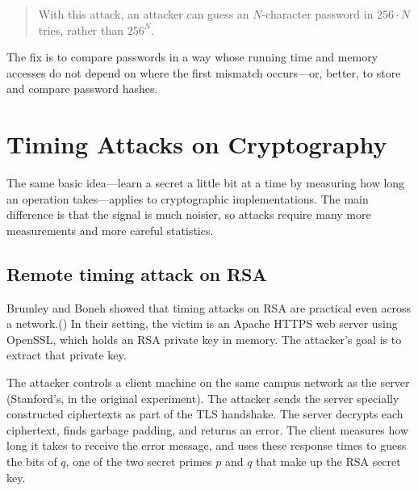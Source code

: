 \documentclass[
  letterpaper,
]{scrbook}
\theoremstyle{definition}
\theoremstyle{plain}
\theoremstyle{plain}
\theoremstyle{remark}
\begin{document}
\begin{quote}
With this attack, an attacker can guess an \(N\)-character password in
\(256 \cdot N\) tries, rather than \(256^N\).
\end{quote}

{}

The fix is to compare passwords in a way whose running time and memory
accesses do not depend on where the first mismatch occurs---or, better,
to store and compare password hashes.

\chapter{Timing Attacks on Cryptography}\label{sec-sc-crypto}

The same basic idea---learn a secret a little bit at a time by measuring
how long an operation takes---applies to cryptographic implementations.
The main difference is that the signal is much noisier, so attacks
require many more measurements and more careful statistics.

\section{Remote timing attack on RSA}\label{remote-timing-attack-on-rsa}

Brumley and Boneh showed that timing attacks on RSA are practical even
across a network.() In their setting, the victim is an Apache HTTPS web server using
OpenSSL, which holds an RSA private key in memory. The attacker's goal
is to extract that private key.

The attacker controls a client machine on the same campus network as the
server (Stanford's, in the original experiment). The attacker sends the
server specially constructed ciphertexts as part of the TLS handshake.
The server decrypts each ciphertext, finds garbage padding, and returns
an error. The client measures how long it takes to receive the error
message, and uses these response times to guess the bits of \(q\), one
of the two secret primes \(p\) and \(q\) that make up the RSA secret
key.
\end{document}
